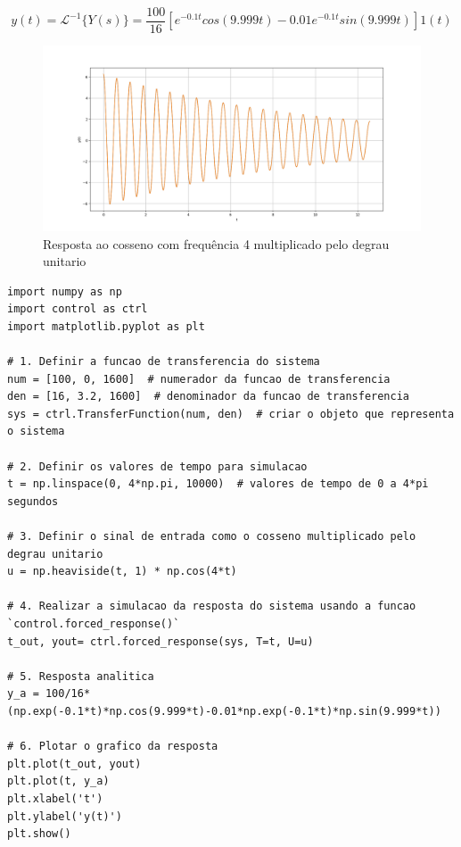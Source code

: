 \documentclass[10pt]{article}
\begin{document}
\begin{equation}
    y(t) = \mathcal{L}^{-1} \{Y(s) \} = \frac{100}{16} \left[ e^{-0.1t}cos(9.999t) - 0.01e^{-0.1t}sin(9.999t) \right] 1(t)
\end{equation}

\begin{figure}[h]
    \centering
    \includegraphics[scale=0.45]{questao2.png}
    \caption{Resposta ao cosseno com frequência 4 multiplicado pelo degrau unitario}
\end{figure}


\begin{lstlisting}
import numpy as np
import control as ctrl
import matplotlib.pyplot as plt

# 1. Definir a funcao de transferencia do sistema
num = [100, 0, 1600]  # numerador da funcao de transferencia
den = [16, 3.2, 1600]  # denominador da funcao de transferencia
sys = ctrl.TransferFunction(num, den)  # criar o objeto que representa o sistema

# 2. Definir os valores de tempo para simulacao
t = np.linspace(0, 4*np.pi, 10000)  # valores de tempo de 0 a 4*pi segundos

# 3. Definir o sinal de entrada como o cosseno multiplicado pelo degrau unitario
u = np.heaviside(t, 1) * np.cos(4*t)

# 4. Realizar a simulacao da resposta do sistema usando a funcao `control.forced_response()`
t_out, yout= ctrl.forced_response(sys, T=t, U=u)

# 5. Resposta analitica
y_a = 100/16*(np.exp(-0.1*t)*np.cos(9.999*t)-0.01*np.exp(-0.1*t)*np.sin(9.999*t))

# 6. Plotar o grafico da resposta
plt.plot(t_out, yout)
plt.plot(t, y_a)
plt.xlabel('t')
plt.ylabel('y(t)')
plt.show()
\end{lstlisting}

\newpage
\end{document}
